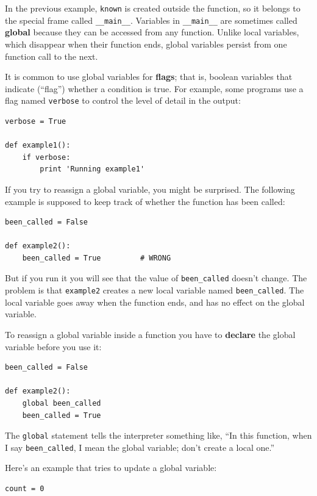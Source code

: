 \documentclass[10pt]{book}
\begin{document}
\begin{CJK}{UTF8}{gbsn}
In the previous example, {\tt known} is created outside the function,
so it belongs to the special frame called \verb"__main__".
Variables in \verb"__main__" are sometimes called {\bf global}
because they can be accessed from any function.  Unlike local
variables, which disappear when their function ends, global variables
persist from one function call to the next.

It is common to use global variables for {\bf flags}; that is, 
boolean variables that indicate (``flag'') whether a condition
is true.  For example, some programs use
a flag named {\tt verbose} to control the level of detail in the
output:

\begin{verbatim}
verbose = True

def example1():
    if verbose:
        print 'Running example1'
\end{verbatim}
%
If you try to reassign a global variable, you might be surprised.
The following example is supposed to keep track of whether the
function has been called:

\begin{verbatim}
been_called = False

def example2():
    been_called = True         # WRONG
\end{verbatim}
%
But if you run it you will see that the value of \verb"been_called"
doesn't change.  The problem is that {\tt example2} creates a new local
variable named \verb"been_called".  The local variable goes away when
the function ends, and has no effect on the global variable.

To reassign a global variable inside a function you have to
{\bf declare} the global variable before you use it:

\begin{verbatim}
been_called = False

def example2():
    global been_called 
    been_called = True
\end{verbatim}
%
The {\tt global} statement tells the interpreter
something like, ``In this function, when I say \verb"been_called", I
mean the global variable; don't create a local one.''

Here's an example that tries to update a global variable:

\begin{verbatim}
count = 0


\end{verbatim}
\end{CJK}
\end{document}
